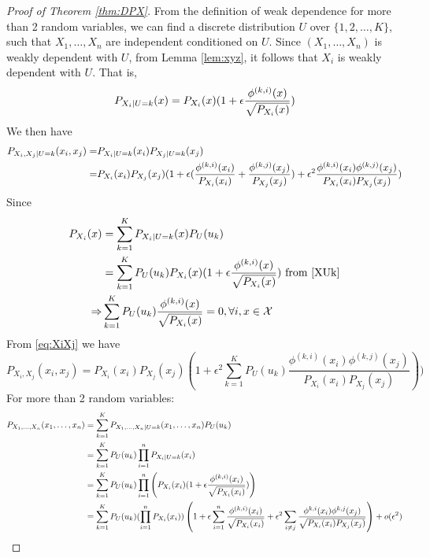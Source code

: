 \begin{proof}[Proof of Theorem \ref{thm:DPX}]
From the definition of weak dependence for more than 2 random variables, we can find a discrete distribution $U$ over $\{1, 2,\dots, K\}$, such that $X_1, \dots, X_n$ are independent conditioned on $U$. Since $(X_1, \dots, X_n)$ is weakly dependent with $U$, from Lemma \ref{lem:xyz}, it follows that $X_i$ is weakly dependent with $U$.  That is, 
\begin{equation}\label{XUk}
P_{X_i | U=k}(x) = P_{X_i} (x)( 1 + \epsilon {\phi^{(k,i)}(x ) \over \sqrt{P_{X_i}(x)}} )
\end{equation}
We then have
\begin{align}
P_{X_i, X_j | U = k}(x_i, x_j)
=& P_{X_i | U=k}(x_i)
P_{X_j | U=k}(x_j) \notag \\
=& P_{X_i}(x_i)P_{X_j}(x_j)
(1 + \epsilon(\frac{\phi^{(k,i)}(x_i)}{P_{X_i}(x_i)}
+ \frac{\phi^{(k,j)}(x_j)}{P_{X_j}(x_j)}) +
\epsilon^2\frac{\phi^{(k,i)}(x_i)
\phi^{(k,j)}(x_j)}{P_{X_i}(x_i)P_{X_j}(x_j)})\label{eq:XiXj}
\end{align}
Since 
\begin{align*}
P_{X_i}(x) &= \sum_{k=1}^{K} P_{X_i | U=k}(x) P_U(u_k) \\
& =  \sum_{k=1}^{K}P_U(u_k)P_{X_i} (x)( 1 + \epsilon {\phi^{(k,i)}(x ) \over \sqrt{P_{X_i}(x)}} ) \textrm{ from } \eqref{XUk}\\
\Rightarrow & \sum_{k=1}^{K} P_U(u_k){\phi^{(k, i)}(x) \over \sqrt{P_{X_i}(x)}} =0,\forall i, x\in \mathcal{X}
\end{align*}
From \eqref{eq:XiXj} we have
\begin{equation}\label{eq:PXiXj}
P_{X_i, X_j}(x_i, x_j) = P_{X_i}(x_i)
P_{X_j}(x_j) (1+\epsilon^2 \sum_{k=1}^K P_U(u_k)
\frac{\phi^{(k,i)}(x_i)
\phi^{(k,j)}(x_j)}{P_{X_i}(x_i)P_{X_j}(x_j)})
)
\end{equation}
For more than 2 random variables:
\begin{align*}
P_{X_1,\dots,X_n}(x_1,\dots,x_n)  &= \sum_{k=1}^{K} P_{X_1,\dots,X_n | U=k}(x_1,\dots,x_n) P_U(u_k) \\
&=  \sum_{k=1}^{K}P_U(u_k) \prod_{i=1}^n P_{X_i|U=k}(x_i)\\
&= \sum_{k=1}^{K} P_U(u_k)\prod_{i=1}^n \left(P_{X_i} (x_i)( 1 + \epsilon {\phi^{(k,i)}(x_i ) \over \sqrt{P_{X_i}(x_i)}} )\right)\\
&=  \sum_{k=1}^{K}P_U(u_k) (\prod_{i=1}^n  P_{X_i} (x_i))
\left( 1 + \epsilon\sum_{i=1}^n {\phi^{(k,i)}(x_i) \over \sqrt{P_{X_i}(x_i)}} + \epsilon^2\sum_{i\neq j}{\phi^{k,i}(x_i)\phi^{k,j}(x_j)\over \sqrt{P_{X_i}(x_i)P_{X_j}(x_j)} }\right)+o(\epsilon^2) \\

\end{align*}
\end{proof}
